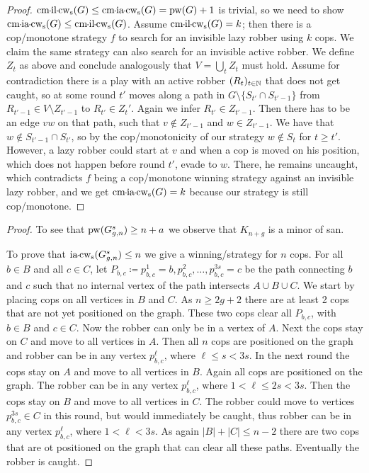 \TheoremInvLazyCopmonotonicity*
\begin{proof}
    $\cmilcopwidth{s}(G) \leq \cmiacopwidth{s}(G) = \pw(G) + 1$ is trivial, so we need to show $\cmiacopwidth{s}(G) \leq \cmilcopwidth{s}(G)$. Assume $\cmilcopwidth{s}(G) = k$; then there is a cop\-/monotone strategy $f$ to search for an invisible lazy robber using $k$ cops. We claim the same strategy can also search for an invisible active robber. We define $Z_t$ as above and conclude analogously that $V=\bigcup_{t}Z_{t}$ must hold. Assume for contradiction there is a play with an active robber $(R_t)_{t\in \N}$ that does not get caught, so at some round $t'$ moves along a path in $G\setminus \{S_{t'} \cap S_{t'-1}\}$ from $R_{t'-1}\in V\setminus Z_{t'-1}$ to $R_{t'}\in Z_t'$. Again we infer $R_{t'}\in Z_{t'-1}$. Then there has to be an edge $vw$ on that path, such that $v\notin Z_{t'-1}$ and $w\in Z_{t'-1}$. We have that $w\notin S_{t'-1} \cap S_{t'}$, so by the cop\-/monotonicity of our strategy $w\notin S_{t}$ for $t\geq t'$. However, a lazy robber could start at $v$ and when a cop is moved on his position, which does not happen before round $t'$, evade to $w$. There, he remains uncaught, which contradicts $f$ being a cop\-/monotone winning strategy against an invisible lazy robber, and we get $\cmiacopwidth{s}(G)=k$ because our strategy is still cop\-/monotone.
\end{proof}

\TheoremInvActRobbermonotonicityBoundSpeed*

\begin{proof}
	To see that $\pw(\iaNonMon sgn)\geq n+a$ we observe that $K_{n+g}$ is a minor of \iaNonMon san.
	
	To prove that $\iacopwidth{s}(\iaNonMon sgn)\leq n$ we give a winning\-/strategy for $n$ cops.
	For all $b\in B$ and all $c\in C$, let $P_{b,c}\coloneqq p_{b,c}^1=b,p_{b,c}^2,\ldots,p_{b,c}^{3s}=c$ be the path connecting $b$ and $c$ such that no internal vertex of the path intersects $A\cup B\cup C$.
	We start by placing cops on all vertices in $B$ and $C$.
	As $n\geq 2g+2$ there are at least 2 cops that are not yet positioned on the graph.
	These two cops clear all $P_{b,c}$, with $b\in B$ and $c\in C$.
	Now the robber can only be in a vertex of $A$.
	Next the cops stay on $C$ and move to all vertices in $A$.
	Then all $n$ cops are positioned on the graph and robber can be in any vertex $p_{b,c}^{\ell}$, where $\ell\leq s<3s$.
	In the next round the cops stay on $A$ and move to all vertices in $B$.
	Again all cops are positioned on the graph.
	The robber can be in any vertex $p_{b,c}^{\ell}$, where $1<\ell\leq 2s<3s$.
	Then the cops stay on $B$ and move to all vertices in $C$.
	The robber could move to vertices $p_{b,c}^{3s}\in C$ in this round, but would immediately be caught, thus robber can be in any vertex $p_{b,c}^{\ell}$, where $1<\ell<3s$.
	As again $|B|+|C|\leq n-2$ there are two cops that are ot positioned on the graph that can clear all these paths.
	Eventually the robber is caught.
\end{proof}

